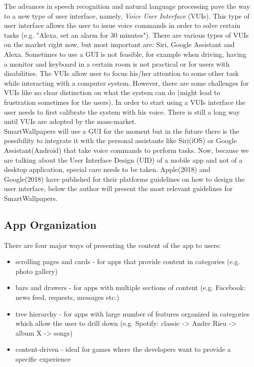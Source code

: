 \documentclass[version=last,fontsize=13pt]{scrartcl}
\begin{document}
	\indent
	The advances in speech recognition and natural language processing pave the way to  a new type of user interface, namely, \textit{Voice User Interface} (VUIs). This type of user interface allows the user to issue voice commands in order to solve certain tasks (e.g. "Alexa, set an alarm for 30 minutes"). There are various types of VUIs on the market right now, but most important are: Siri, Google Assistant and Alexa. Sometimes to use a GUI is not feasible, for example when driving, having a monitor and keyboard in a certain room is not practical or for users with disabilities. The  VUIs allow user to focus his/her attention to some other task while interacting with a computer system. However, there are some challenges for VUIs like no clear distinction on what the system can do (might lead to frustration sometimes for the users). In order to start using a VUIs interface the user needs to first calibrate the system with his voice. There is still a long way until VUIs are adopted by the mass-market.\\

	\indent
	SmartWallpapers will use a GUI for the moment but in the future there is the possibility to integrate it with the personal assistants like Siri(iOS) or Google Assistant(Android) that take voice commands to perform tasks. Now, because we are talking about the User Interface Design (UID) of a mobile app and not of a desktop application, special care needs to be taken. Apple(2018) and Google(2018) have published for their platforms guidelines on how to design the user interface, below the author will present the most relevant guidelines for SmartWallpapers.

\subsection{App Organization}
	There are four major ways of presenting the content of the app to users: 
		\begin{itemize}
			
			\item scrolling pages and cards - for apps that provide content in categories (e.g. photo gallery)

			\item bars and drawers -  for apps with multiple sections of content (e.g. Facebook: news feed, requests, messages etc.)

			\item tree hierarchy - for apps with large number of features organized in categories which allow the user to drill down (e.g. Spotify: classic -> Andre Rieu -> album X -> songs)

			\item content-driven - ideal for games where the developers want to provide a specific experience 

		\end{itemize}
\end{document}
